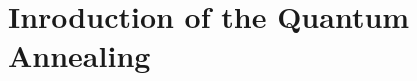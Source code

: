 \documentclass{beamer}
\begin{document}
\section{Inroduction of the Quantum Annealing}
%	
%	
%		
\end{document}
